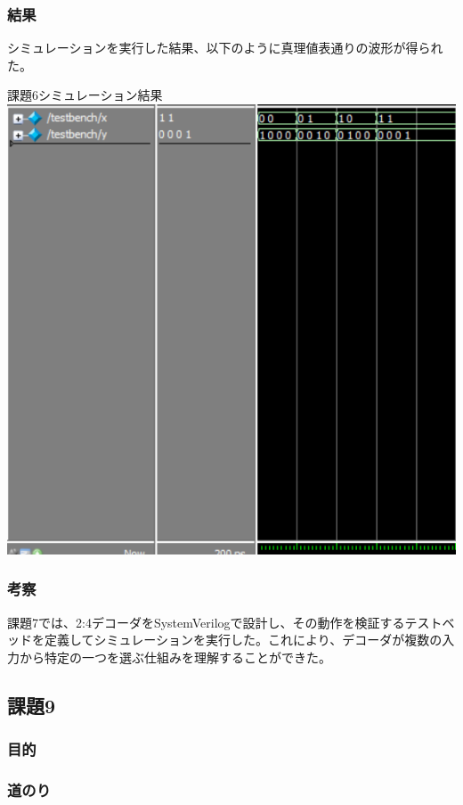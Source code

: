 \documentclass[a4paper]{jarticle}
\begin{document}
\subsubsection{結果}
シミュレーションを実行した結果、以下のように真理値表通りの波形が得られた。
\begin{center}
	課題6シミュレーション結果
	\includegraphics[width=15cm]{7-m.PNG}
\end{center}
\subsubsection{考察}
課題7では、2:4デコーダをSystemVerilogで設計し、その動作を検証するテストベッドを定義してシミュレーションを実行した。これにより、デコーダが複数の入力から特定の一つを選ぶ仕組みを理解することができた。
\subsection{課題9}
\subsubsection{目的}

\subsubsection{道のり}
\end{document}
